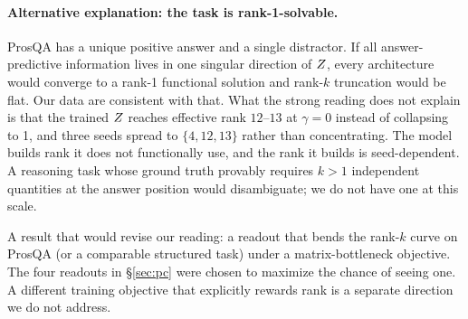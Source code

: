 \paragraph{Alternative explanation: the task is rank-1-solvable.}
ProsQA has a unique positive answer and a single distractor. If
all answer-predictive information lives in one singular direction
of $Z$, every architecture would converge to a rank-1 functional
solution and rank-$k$ truncation would be flat. Our data are
consistent with that. What the strong reading does not explain
is that the trained $Z$ reaches effective rank $12$--$13$ at
$\gamma=0$ instead of collapsing to 1, and three seeds spread to
$\{4,12,13\}$ rather than concentrating. The model builds rank it
does not functionally use, and the rank it builds is
seed-dependent. A reasoning task whose ground truth provably
requires $k>1$ independent quantities at the answer position would
disambiguate; we do not have one at this scale.

A result that would revise our reading: a readout that bends the
rank-$k$ curve on ProsQA (or a comparable structured task) under a
matrix-bottleneck objective. The four readouts in \S\ref{sec:pc}
were chosen to maximize the chance of seeing one. A different
training objective that explicitly rewards rank is a separate
direction we do not address.
